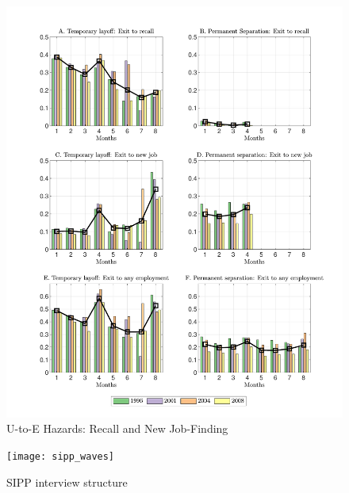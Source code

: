 \documentclass[12pt]{article}
\begin{document}
  \begin{figure}
    \caption{U-to-E Hazards: Recall and New Job-Finding\label{fig:UE}}
  \centerline{\includegraphics[width=1.00\linewidth]{./../figures/all}}
  \end{figure}

  \begin{figure}
  \caption{SIPP interview structure}
    \begin{center}
      \texttt{[image: sipp\_waves]}
    \end{center}
  \end{figure}
\end{document}
